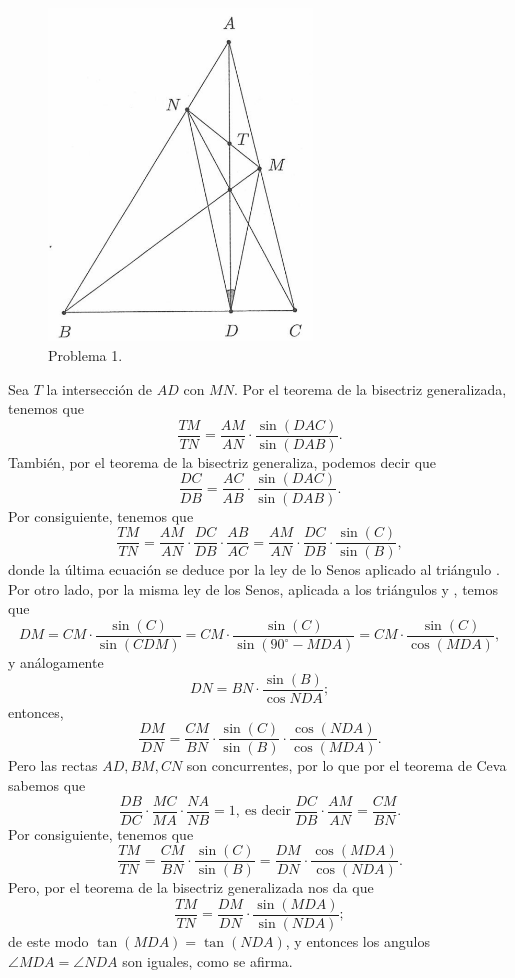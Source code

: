 \begin{solution}
    \begin{figure}[H]
        \centering
        \includegraphics[width=7cm]{images/p1}
        \caption{Problema 1.}
    \end{figure}
    Sea $T$ la intersección de $AD$ con $MN$.
    Por el teorema de la bisectriz generalizada, tenemos que
    \[
        \frac{TM}{TN} = \frac{AM}{AN}\cdot \frac{\sin{(DAC)}}{\sin{(DAB)}}.
    \]
    También, por el teorema de la bisectriz generaliza, podemos decir que
    \[
        \frac{DC}{DB} = \frac{AC}{AB} \cdot \frac{\sin{(DAC)}}{\sin{(DAB)}}.
    \]
    Por consiguiente, tenemos que
    \[
        \frac{TM}{TN} = \frac{AM}{AN}\cdot \frac{DC}{DB}\cdot \frac{AB}{AC} = \frac{AM}{AN}\cdot \frac{DC}{DB}\cdot \frac{\sin{(C)}}{\sin{(B)}},
    \]
    donde la última ecuación se deduce por la ley de lo Senos aplicado al triángulo .
    Por otro lado, por la misma ley de los Senos, aplicada a los triángulos  y , temos que
    \[
        DM = CM \cdot \frac{\sin{(C)}}{\sin{(CDM)}} = CM \cdot \frac{\sin{(C)}}{\sin{(90^{\circ} - MDA)}} = CM \cdot \frac{\sin{(C)}}{\cos{(MDA)}},
    \]
    y análogamente
    \[
        DN = BN \cdot \frac{\sin{(B)}}{\cos{NDA}};
    \]
    entonces,
    \[
        \frac{DM}{DN} = \frac{CM}{BN} \cdot \frac{\sin{(C)}}{\sin{(B)}} \cdot \frac{\cos{(NDA)}}{\cos{(MDA)}}.
    \]    
    Pero las rectas $AD, BM, CN$ son concurrentes, por lo que por el teorema de Ceva sabemos que
    \[
        \frac{DB}{DC}\cdot \frac{MC}{MA}\cdot \frac{NA}{NB} = 1,\ \text{es decir}\ \frac{DC}{DB} \cdot \frac{AM}{AN} = \frac{CM}{BN}.
    \]
    Por consiguiente, tenemos que
    \[
        \frac{TM}{TN} = \frac{CM}{BN} \cdot \frac{\sin{(C)}}{\sin{(B)}} = \frac{DM}{DN} \cdot \frac{\cos{(MDA)}}{\cos{(NDA)}}.
    \]
    Pero, por el teorema de la bisectriz generalizada nos da que
    \[
        \frac{TM}{TN} = \frac{DM}{DN} \cdot \frac{\sin{(MDA)}}{\sin{(NDA)}};
    \]
    de este modo $\tan{(MDA)} = \tan{(NDA)}$, y entonces los angulos $\angle MDA = \angle NDA$ son iguales, como se afirma.
\end{solution}


